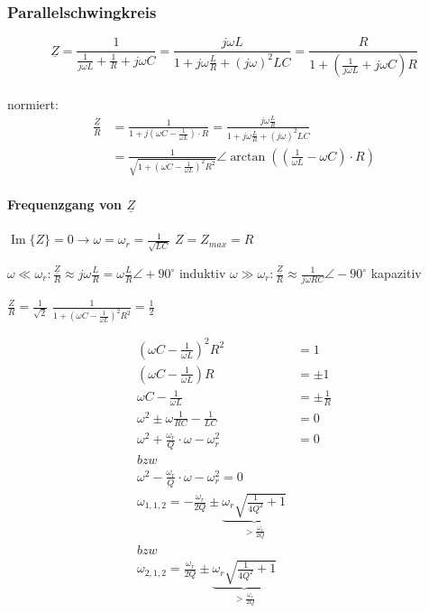   
\subsubsection{Parallelschwingkreis}
$$\underline{Z} = \frac{1}{\frac{1}{j\omega L}+\frac{1}{R} + j \omega C}
= \frac{j\omega L}{1+j\omega \frac{L}{R}+(j\omega)^2LC}
= \frac{R}{1+(\frac{1}{j\omega L}+j\omega C)R}$$\\
normiert:\\
\begin{align}
\frac{\underline{Z}}{R}&=\frac{1}{1+j(\omega C-\frac{1}{\omega L})\cdot R}
=\frac{j\omega \frac{L}{R}}{1+j\omega\frac{L}{R}+(j\omega)^2LC}\nonumber\\
&=\frac{1}{\sqrt{1+(\omega C - \frac{1}{\omega
L})^2R^2}} \angle \arctan{\left(\left(\frac{1}{\omega L}-\omega C\right)\cdot
R\right)}
\nonumber
\end{align}


\paragraph{Frequenzgang von $\underline Z$}
\begin{description}
[style=multiline,topsep=0pt,leftmargin=4.5cm,rightmargin=2cm]
  \item[Spezieller Punkt]
  	$\operatorname{Im}{\{Z\}} = 0 \rightarrow \omega =
	\omega_r=\frac{1}{\sqrt{LC}}$ \newline
	$Z = Z_{max} = R$
  \item[Tiefe Frequenzen]
    $\omega \ll \omega_r: \frac{\underline Z}{R} \approx
	j\omega\frac{L}{R}=\omega\frac{L}{R} \angle +90^\circ$ induktiv \newline
	$\omega \gg \omega_r: \frac{\underline Z}{R} \approx
	  \frac{1}{j\omega RC} \angle -90^\circ$ kapazitiv
  \item[3dB-Punkt]
    $\frac{Z}{R}=\frac{1}{\sqrt{2}}$ \newline
	$\frac{1}{1+(\omega C-\frac{1}{\omega L})^2R^2}=\frac{1}{2}$
\end{description}



\begin{align}
	\left(\omega C-\frac{1}{\omega L}\right)^2R^2 &= 1\nonumber\\
	\left(\omega C - \frac{1}{\omega L}\right)R &= \pm 1\nonumber\\
	\omega C - \frac{1}{\omega L} &= \pm \frac{1}{R}\nonumber\\
	\omega^2 \pm \omega \frac{1}{RC}-\frac{1}{LC} &= 0\nonumber\\
	\omega^2 + \frac{\omega_r}{Q}\cdot \omega - \omega_r^2&=0 \\ bzw\\ \omega^2 -
	\frac{\omega_r}{Q}\cdot \omega - \omega_r^2=0\nonumber\\
	\omega_{1,1,2} = -\frac{\omega_r}{2Q} \pm 
	\underbrace{\omega_r\sqrt{\frac{1}{4Q^2}+1}}_{>\frac{\omega_r}{2Q}}
	\\	bzw \\
	\omega_{2,1,2}=\frac{\omega_r}{2Q} \pm
	\underbrace{\omega_r\sqrt{\frac{1}{4Q^2}+1}}_{>\frac{\omega_r}{2Q}} \nonumber\\
\end{align}



